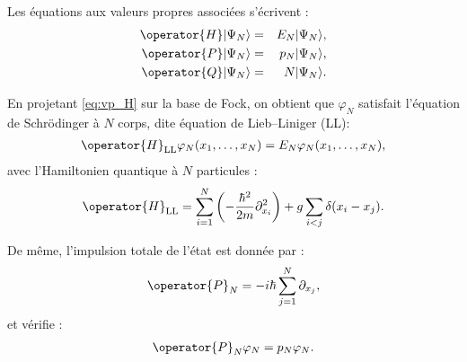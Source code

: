 Les équations aux valeurs propres associées s’écrivent :
\begin{eqnarray}
\operator{H} |\Psi_N\rangle &=& E_N |\Psi_N\rangle, \label{eq:vp_H} \\
\operator{P} |\Psi_N\rangle &=& p_N |\Psi_N\rangle, \label{eq:vp_P} \\
\operator{Q} |\Psi_N\rangle &=& N |\Psi_N\rangle. \label{eq:vp_Q}
\end{eqnarray}





En projetant \eqref{eq:vp_H} sur la base de Fock, on obtient que \( \varphi_N \) satisfait l’équation de Schrödinger à $N$ corps, dite équation de Lieb–Liniger (LL):
\begin{eqnarray}
\operator{H}_{\mathrm{LL}}  \varphi_N(x_1, \ldots, x_N) = E_N  \varphi_N(x_1, \ldots, x_N), \label{eq:hamiltonien_LL}
\end{eqnarray}
avec l’Hamiltonien quantique à $N$ particules :
\begin{eqnarray}
\operator{H}_{\mathrm{LL}} = \sum_{i=1}^N \left( -\frac{\hbar^2}{2m} \partial_{x_i}^2 \right) + g \sum_{i<j} \delta(x_i - x_j). \label{eq:H_LL_detail}
\end{eqnarray}

De même, l’impulsion totale de l’état est donnée par :
\begin{eqnarray}
\operator{P}_N = -i\hbar \sum_{j=1}^N \partial_{x_j}, \label{eq:impulsion_N}
\end{eqnarray}
et vérifie :
\begin{eqnarray}
\operator{P}_N  \varphi_N = p_N  \varphi_N. \label{eq:vp_PN}
\end{eqnarray}
 





